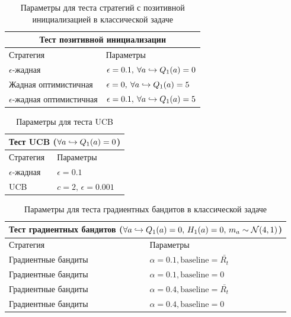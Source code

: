 \begin{table}
\centering
\renewcommand{\arraystretch}{1.3}
\begin{tabular}{ |m{4cm}|m{5cm}|  }
 \hline
 \multicolumn{2}{|c|}{Тест позитивной инициализации} \\
 \hline
 Стратегия & Параметры \\
 \hline
 $\epsilon$-жадная & $\epsilon = 0.1, \: \forall a \hookrightarrow Q_1(a) = 0$ \\
 \hline
 Жадная оптимистичная & $\epsilon = 0, \: \forall a \hookrightarrow Q_1(a) = 5$ \\
 \hline
 $\epsilon$-жадная оптимистичная & $\epsilon = 0.1, \: \forall a \hookrightarrow Q_1(a) = 5$ \\
 \hline
\end{tabular}
\caption{Параметры для теста стратегий с позитивной инициализацией в классической задаче}
\label{table:classic_positive}
\end{table}

\begin{table}
\centering
\renewcommand{\arraystretch}{1.3}
\begin{tabular}{ |m{3cm}|m{4cm}|  }
 \hline
 \multicolumn{2}{|c|}{Тест UCB ($\forall a \hookrightarrow Q_1(a) = 0$)} \\
 \hline
 Стратегия & Параметры \\
 \hline
 $\epsilon$-жадная & $\epsilon = 0.1$ \\
 \hline
 UCB & $c=2, \, \epsilon=0.001$ \\
 \hline
\end{tabular}
\caption{Параметры для теста UCB}
\label{table:classic_ucb}
\end{table}

\begin{table}
\centering
\renewcommand{\arraystretch}{1.3}
\begin{tabular}{ |m{4cm}|m{6cm}|  }
 \hline
 \multicolumn{2}{|c|}{Тест градиентных бандитов ($\forall a \hookrightarrow Q_1(a) = 0, \, H_1(a) = 0, \, m_a \sim \mathcal{N}(4,1)$)} \\
 \hline
 Стратегия & Параметры \\
 \hline
 Градиентные бандиты & $\alpha=0.1, \text{baseline} = \bar{R_t}$ \\
 \hline
 Градиентные бандиты & $\alpha=0.1, \text{baseline} = 0$ \\
 \hline
 Градиентные бандиты & $\alpha=0.4, \text{baseline} = \bar{R_t}$ \\
 \hline
 Градиентные бандиты & $\alpha=0.4, \text{baseline} = 0$ \\
 \hline
\end{tabular}
\caption{Параметры для теста градиентных бандитов в классической задаче}
\label{table:classic_gradient_bandits}
\end{table}


